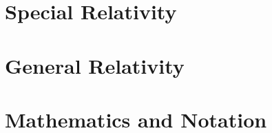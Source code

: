 \documentclass[a4paper, titlepage]{book}
\begin{document}
\frontmatter


\tableofcontents


\mainmatter
\chapter{Special Relativity}


\chapter{General Relativity}


\appendix
\chapter{Mathematics and Notation}


\backmatter
\printbibliography[title={References}]
\end{document}
